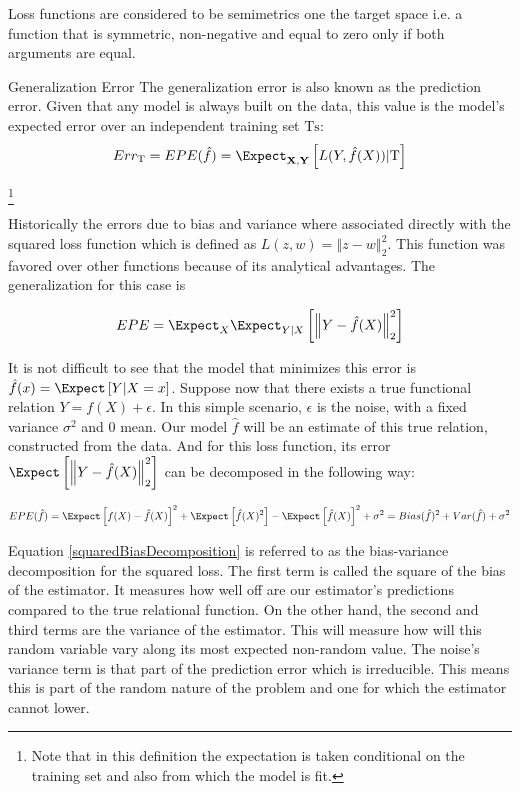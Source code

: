 Loss functions are considered to be semimetrics one the target space i.e. a function that is symmetric, non-negative and equal to zero only if both arguments are equal.
 
 
 \begin{definition}{Generalization Error}
 	The generalization error is also known as the prediction error. Given that any model is always built on the data, this value is the model's expected error over an independent training set $\mathrm{Ts}$:
 	$$ Err_{\mathrm{T}} =  EPE(\hat{f})= \Expect_{\textbf{X},\textbf{Y}} \left[ L(Y,\hat{f}(X)) |  \mathrm{T}\right]$$
 \end{definition}\footnote{Note that in this definition the expectation is taken conditional on the training set and also from which the model is fit.}
 
 Historically the errors due to bias and variance where associated directly with the squared loss function which is defined as $L(z,w) = \left\Vert z-w \right\Vert^2_2$. This function was favored over other functions because of its analytical advantages.  The generalization for this case is
 
 \begin{equation}\label{squaredEPE}
 EPE = \Expect_X \Expect_{Y|X} \left[ \left\Vert  Y - \hat{f}(X)  \right\Vert_2^2 \right]
 \end{equation}
 
 It is not difficult to see that the model that minimizes this error is $\hat{f}(x) = \Expect \left[ Y | X=x \right] $. Suppose now that there exists a true functional relation $Y = f(X) + \epsilon$. 
 In this simple scenario, $\epsilon$ is the noise, with a fixed variance $\sigma^2$ and $0$ mean. Our model $\hat{f}$ will be an estimate of this true relation, constructed from the data. And for this loss function, its error $\Expect \left[ \left\Vert Y  - \hat{f}(X) \right\Vert_2^2 \right]$ can be decomposed in the following way:
 
 \begin{equation}\label{squaredBiasDecomposition}
 EPE( \hat{f} ) = \Expect \left[   f(X)  - \hat{f}(X) \right]^2 +  \Expect \left[ \hat{f}(X)^2  \right] - \Expect \left[ \hat{f}(X)  \right]^2  + \sigma^2
 = Bias(\hat{f})^2 + Var(\hat{f}) + \sigma^2
 \end{equation}
 
 Equation \ref{squaredBiasDecomposition} is referred to as the bias-variance decomposition for the squared loss. The first term is called the square of the bias of the estimator. It measures how well off are our estimator's predictions compared to the true relational function. On the other hand, the second and third terms are the variance of the estimator. This will measure how will this random variable vary along its most expected non-random value. The noise's variance term is that part of the prediction error which is irreducible. This means this is part of the random nature of the problem and one for which the estimator cannot lower.
 
